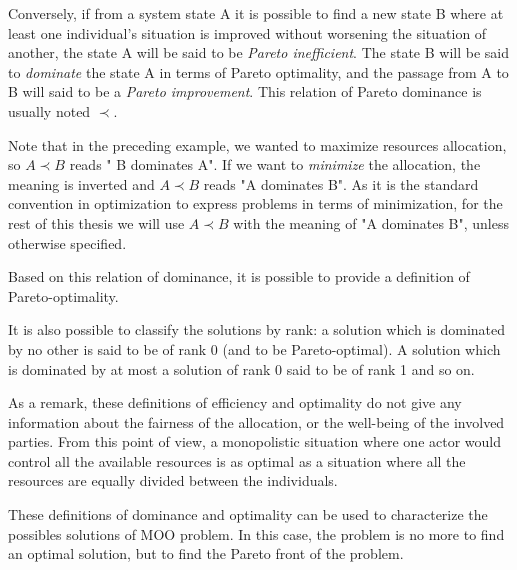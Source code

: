 Conversely, if from a system state A it is possible to find a new state B where at least one individual's situation is improved without worsening the situation of another, the state A will be said to be \emph{Pareto inefficient}. The state B will be said to \emph{dominate} the state A in terms of Pareto optimality, and the passage from A to B will said to be a \emph{Pareto improvement}. This relation of Pareto dominance is usually noted \(\prec\).


Note that in the preceding example, we wanted to maximize resources allocation, so \(A \prec B\) reads " B dominates A". If we want to \emph{minimize} the allocation, the meaning is inverted and  \(A \prec B\) reads "A dominates B".
As it is the standard convention in optimization to express problems in terms of minimization, for the rest of this thesis we will use \(A \prec B\) with the meaning of "A dominates B", unless otherwise specified.

Based on this relation of dominance, it is possible to provide a definition of Pareto-optimality.



It is also possible to classify the solutions by rank: a solution which is dominated by no other is said to be of rank 0 (and to be Pareto-optimal). A solution which is dominated by at most a solution of rank 0 said to be of rank 1 and so on.

As a remark, these definitions of efficiency and optimality do not give any information about the fairness of the allocation, or the well-being of the involved parties. From this point of view, a monopolistic situation where one actor would control all the available resources is as optimal as a situation where all the resources are equally divided between the individuals.

These definitions of dominance and optimality can be used to characterize the possibles solutions of MOO problem. In this case, the problem is no more to find an optimal solution, but to find the Pareto front of the problem.

